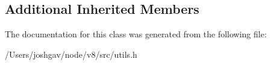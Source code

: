 \subsection*{Additional Inherited Members}


The documentation for this class was generated from the following file\+:\begin{DoxyCompactItemize}
\item 
/\+Users/joshgav/node/v8/src/utils.\+h\end{DoxyCompactItemize}
